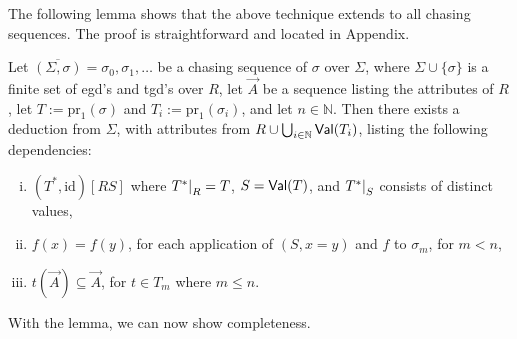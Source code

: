 \documentclass[envcountset]{llncs}
\newcommand{\problemFont}[1]{\protect\ensuremath{\mathsf{#1}}}
\newcommand{\si}{\sigma}
\newcommand{\Si}{\Sigma}
\newcommand{\sub}{\subseteq}
\newcommand{\pr}{\mathrm{pr}}
\newcommand{\tuple}[1]{\vec{#1}}
\newcommand{\N}{\mathbb{N}}
\newcommand\re[2]{{\left.\kern-\nulldelimiterspace #1 \vphantom{|} \right|_{#2} }}
\newcommand{\Val}{\problemFont{Val}}
\newcommand{\chase}[1]{\overline{(#1)}}
\newcommand{\id}{\mathrm{id}}
\begin{document}
The following lemma shows that the above technique extends to all chasing sequences. The proof is straightforward and located in Appendix. \begin{lemma}\label{complem}
Let $\chase{\Si,\si}=\si_0,\si_1,\ldots$ be a chasing sequence of $\si$ over $\Si$, where   $\Si \cup \{\si\}$ is a finite set of egd's and tgd's over $R$, let $\tuple A$ be a sequence listing the attributes of $R$, let $T:=\pr_1(\si)$ and $T_i := \pr_1(\si_i)$, and let $n\in \mathbb{N}$. Then there exists a deduction from $\Si$, with  attributes from $R\cup\bigcup_{i\in \N} \Val(T_i)$, listing the following dependencies:
\begin{enumerate}[(i)]
\item $(T^*,\id)[RS]$
where $\re{T^*}{R}=T$, $S=\Val(T)$, and $ \re{T^*}{S}$ consists of distinct values,
\item $f(x)=f(y)$, for each application of  $(S,x=y)$ and  $f$  to $\si_m$, for $m < n$,

\item $ t(\tuple A) \sub \tuple A$, for $t \in T_m$ where  $m\leq n$.
\end{enumerate}
\end{lemma}

With the lemma, we can now show completeness.
\end{document}
